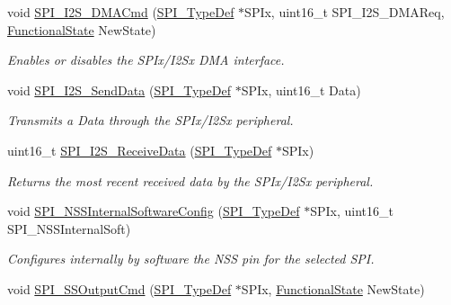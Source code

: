 \begin{DoxyCompactItemize}
void \mbox{\hyperlink{group___s_p_i___exported___functions_gabed5b91a8576e6d578f364cc0e807e4a}{S\+P\+I\+\_\+\+I2\+S\+\_\+\+D\+M\+A\+Cmd}} (\mbox{\hyperlink{struct_s_p_i___type_def}{S\+P\+I\+\_\+\+Type\+Def}} $\ast$S\+P\+Ix, uint16\+\_\+t S\+P\+I\+\_\+\+I2\+S\+\_\+\+D\+M\+A\+Req, \mbox{\hyperlink{group___exported__types_gac9a7e9a35d2513ec15c3b537aaa4fba1}{Functional\+State}} New\+State)
\begin{DoxyCompactList}\small\item\em Enables or disables the S\+P\+Ix/\+I2\+Sx D\+MA interface. \end{DoxyCompactList}\item 
void \mbox{\hyperlink{group___s_p_i___exported___functions_gad5af40bebe8dbe3fa8bd476489d7e3da}{S\+P\+I\+\_\+\+I2\+S\+\_\+\+Send\+Data}} (\mbox{\hyperlink{struct_s_p_i___type_def}{S\+P\+I\+\_\+\+Type\+Def}} $\ast$S\+P\+Ix, uint16\+\_\+t Data)
\begin{DoxyCompactList}\small\item\em Transmits a Data through the S\+P\+Ix/\+I2\+Sx peripheral. \end{DoxyCompactList}\item 
uint16\+\_\+t \mbox{\hyperlink{group___s_p_i___exported___functions_gab77de76547f3bff403236b263b070a30}{S\+P\+I\+\_\+\+I2\+S\+\_\+\+Receive\+Data}} (\mbox{\hyperlink{struct_s_p_i___type_def}{S\+P\+I\+\_\+\+Type\+Def}} $\ast$S\+P\+Ix)
\begin{DoxyCompactList}\small\item\em Returns the most recent received data by the S\+P\+Ix/\+I2\+Sx peripheral. \end{DoxyCompactList}\item 
void \mbox{\hyperlink{group___s_p_i___exported___functions_ga56fc508a482f032f9eb80e4c63184126}{S\+P\+I\+\_\+\+N\+S\+S\+Internal\+Software\+Config}} (\mbox{\hyperlink{struct_s_p_i___type_def}{S\+P\+I\+\_\+\+Type\+Def}} $\ast$S\+P\+Ix, uint16\+\_\+t S\+P\+I\+\_\+\+N\+S\+S\+Internal\+Soft)
\begin{DoxyCompactList}\small\item\em Configures internally by software the N\+SS pin for the selected S\+PI. \end{DoxyCompactList}\item 
void \mbox{\hyperlink{group___s_p_i___exported___functions_ga4ec54abdedf6cd17403d853a926d91c1}{S\+P\+I\+\_\+\+S\+S\+Output\+Cmd}} (\mbox{\hyperlink{struct_s_p_i___type_def}{S\+P\+I\+\_\+\+Type\+Def}} $\ast$S\+P\+Ix, \mbox{\hyperlink{group___exported__types_gac9a7e9a35d2513ec15c3b537aaa4fba1}{Functional\+State}} New\+State)

\end{DoxyCompactItemize}
